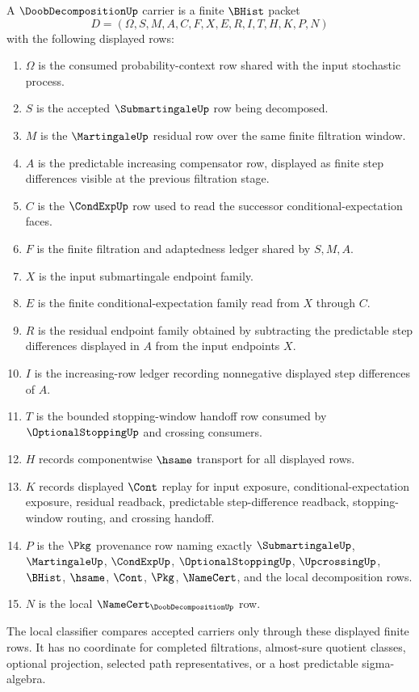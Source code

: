 \begin{definition}
\label{def:doob-decomposition-carrier}
A $\DoobDecompositionUp$ carrier is a finite $\BHist$ packet
$$
D=(\Omega,S,M,A,C,F,X,E,R,I,T,H,K,P,N)
$$
with the following displayed rows:
\begin{enumerate}
\item $\Omega$ is the consumed probability-context row shared with the input stochastic process.
\item $S$ is the accepted $\SubmartingaleUp$ row being decomposed.
\item $M$ is the $\MartingaleUp$ residual row over the same finite filtration window.
\item $A$ is the predictable increasing compensator row, displayed as finite step differences visible at the previous filtration stage.
\item $C$ is the $\CondExpUp$ row used to read the successor conditional-expectation faces.
\item $F$ is the finite filtration and adaptedness ledger shared by $S,M,A$.
\item $X$ is the input submartingale endpoint family.
\item $E$ is the finite conditional-expectation family read from $X$ through $C$.
\item $R$ is the residual endpoint family obtained by subtracting the predictable step differences displayed in $A$ from the input endpoints $X$.
\item $I$ is the increasing-row ledger recording nonnegative displayed step differences of $A$.
\item $T$ is the bounded stopping-window handoff row consumed by $\OptionalStoppingUp$ and crossing consumers.
\item $H$ records componentwise $\hsame$ transport for all displayed rows.
\item $K$ records displayed $\Cont$ replay for input exposure, conditional-expectation exposure, residual readback, predictable step-difference readback, stopping-window routing, and crossing handoff.
\item $P$ is the $\Pkg$ provenance row naming exactly $\SubmartingaleUp$, $\MartingaleUp$, $\CondExpUp$, $\OptionalStoppingUp$, $\UpcrossingUp$, $\BHist$, $\hsame$, $\Cont$, $\Pkg$, $\NameCert$, and the local decomposition rows.
\item $N$ is the local $\NameCert_{\DoobDecompositionUp}$ row.
\end{enumerate}
The local classifier compares accepted carriers only through these displayed finite rows. It has no coordinate for completed filtrations, almost-sure quotient classes, optional projection, selected path representatives, or a host predictable sigma-algebra.
\end{definition}

